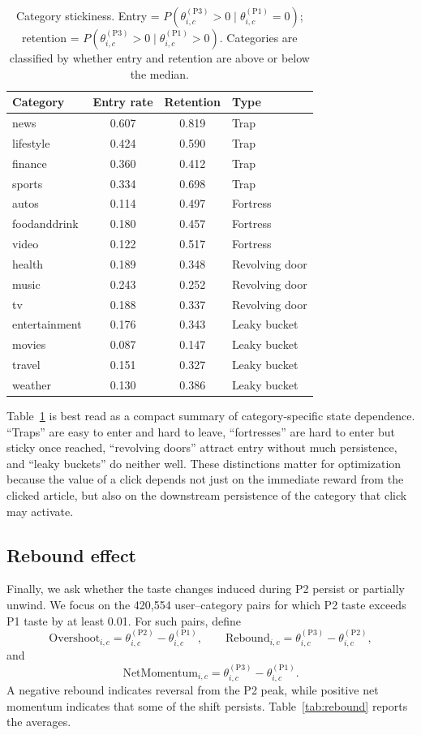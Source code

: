 \documentclass[11pt]{article}
\begin{document}
\begin{table}[ht]
\centering
\caption{Category stickiness. Entry = $P(\theta_{i,c}^{(\text{P3})} > 0 \mid \theta_{i,c}^{(\text{P1})} = 0)$; retention = $P(\theta_{i,c}^{(\text{P3})} > 0 \mid \theta_{i,c}^{(\text{P1})} > 0)$. Categories are classified by whether entry and retention are above or below the median.}
\label{tab:stickiness}
\begin{tabular}{lccl}
\toprule
Category & Entry rate & Retention & Type \\
\midrule
news & 0.607 & 0.819 & Trap \\
lifestyle & 0.424 & 0.590 & Trap \\
finance & 0.360 & 0.412 & Trap \\
sports & 0.334 & 0.698 & Trap \\
autos & 0.114 & 0.497 & Fortress \\
foodanddrink & 0.180 & 0.457 & Fortress \\
video & 0.122 & 0.517 & Fortress \\
health & 0.189 & 0.348 & Revolving door \\
music & 0.243 & 0.252 & Revolving door \\
tv & 0.188 & 0.337 & Revolving door \\
entertainment & 0.176 & 0.343 & Leaky bucket \\
movies & 0.087 & 0.147 & Leaky bucket \\
travel & 0.151 & 0.327 & Leaky bucket \\
weather & 0.130 & 0.386 & Leaky bucket \\
\bottomrule
\end{tabular}
\end{table}
\FloatBarrier

Table~\ref{tab:stickiness} is best read as a compact summary of category-specific state dependence. ``Traps'' are easy to enter and hard to leave, ``fortresses'' are hard to enter but sticky once reached, ``revolving doors'' attract entry without much persistence, and ``leaky buckets'' do neither well. These distinctions matter for optimization because the value of a click depends not just on the immediate reward from the clicked article, but also on the downstream persistence of the category that click may activate.
\subsection{Rebound effect}

Finally, we ask whether the taste changes induced during P2 persist or partially unwind. We focus on the 420,554 user--category pairs for which P2 taste exceeds P1 taste by at least 0.01. For such pairs, define
\[
\text{Overshoot}_{i,c} = \theta_{i,c}^{(\mathrm{P2})} - \theta_{i,c}^{(\mathrm{P1})},
\qquad
\text{Rebound}_{i,c} = \theta_{i,c}^{(\mathrm{P3})} - \theta_{i,c}^{(\mathrm{P2})},
\]
and
\[
\text{NetMomentum}_{i,c} = \theta_{i,c}^{(\mathrm{P3})} - \theta_{i,c}^{(\mathrm{P1})}.
\]
A negative rebound indicates reversal from the P2 peak, while positive net momentum indicates that some of the shift persists. Table~\ref{tab:rebound} reports the averages.
\end{document}
